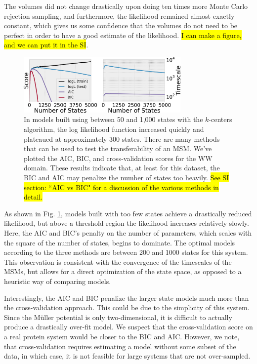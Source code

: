 \documentclass[twocolumn,floatfix,nofootinbib,aps]{revtex4-1}
\begin{document}
The volumes did not change drastically upon doing ten times more Monte Carlo rejection sampling, and furthermore, the likelihood remained almost exactly constant, which gives us some confidence that the volumes do not need to be perfect in order to have a good estimate of the likelihood. \hl{I can make a figure, and we can put it in the SI}.

\begin{figure}[h]
\centering
\includegraphics[width=3.3in]{figs/mull_cross.png}
\caption{In models built using between 50 and 1,000 states with the $k$-centers algorithm, the log likelihood function increased quickly and plateaued at approximately 300 states. There are many methods that can be used to test the transferability of an MSM. We've plotted the AIC, BIC, and cross-validation scores for the WW domain. These results indicate that, at least for this dataset, the BIC and AIC may penalize the number of states too heavily. \hl{See SI section: ``AIC vs BIC" for a discussion of the various methods in detail.}}
\label{fig:mullerlike}
\end{figure}

As shown in Fig. \ref{fig:mullerlike}, models built with too few states achieve a drastically reduced likelihood, but above a threshold region the likelihood increases relatively slowly. Here, the AIC and BIC's penalty on the number of parameters, which scales with the square of the number of states, begins to dominate. The optimal models according to the three methods are between 200 and 1000 states for this system. This observation is consistent with the convergence of the timescales of the MSMs, but allows for a direct optimization of the state space, as opposed to a heuristic way of comparing models.

Interestingly, the AIC and BIC penalize the larger state models much more than the cross-validation approach. This could be due to the simplicity of this system. Since the M\"uller potential is only two-dimensional, it is difficult to actually produce a drastically over-fit model. We suspect that the cross-validation score on a real protein system would be closer to the BIC and AIC. However, we note, that cross-validation requires estimating a model without some subset of the data, in which case, it is not feasible for large systems that are not over-sampled.
\end{document}
